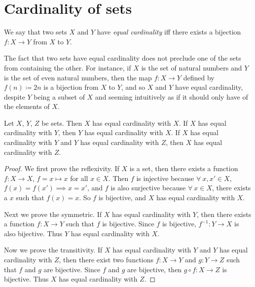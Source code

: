 \section{Cardinality of sets}

\begin{definition}\label{3.6.1}
We say that two sets \(X\) and \(Y\) have \emph{equal cardinality} iff there exists a bijection \(f : X \to Y\) from \(X\) to \(Y\).
\end{definition}

\setcounter{theorem}{2}
\begin{remark}\label{3.6.3}
The fact that two sets have equal cardinality does not preclude one of the sets from containing the other.
For instance, if \(X\) is the set of natural numbers and \(Y\) is the set of even natural numbers, then the map \(f : X \to Y\) defined by \(f(n) \coloneqq 2n\) is a bijection from \(X\) to \(Y\), and so \(X\) and \(Y\) have equal cardinality, despite \(Y\) being a subset of \(X\) and seeming intuitively as if it should only have  of the elements of \(X\).
\end{remark}

\begin{proposition}\label{3.6.4}
Let \(X\), \(Y\), \(Z\) be sets.
Then \(X\) has equal cardinality with \(X\).
If \(X\) has equal cardinality with \(Y\), then \(Y\) has equal cardinality with \(X\).
If \(X\) has equal cardinality with \(Y\) and \(Y\) has equal cardinality with \(Z\), then \(X\) has equal cardinality with \(Z\).
\end{proposition}

\begin{proof}
We first prove the reflexivity.
If \(X\) is a set, then there exists a function \(f : X \to X\), \(f = x \mapsto x\) for all \(x \in X\).
Then \(f\) is injective because \(\forall\ x, x' \in X\), \(f(x) = f(x') \implies x = x'\), and \(f\) is also surjective because \(\forall\ x \in X\), there exists a \(x\) such that \(f(x) = x\).
So \(f\) is bijective, and \(X\) has equal cardinality with \(X\).

Next we prove the symmetric.
If \(X\) has equal cardinality with \(Y\), then there exists a function \(f : X \to Y\) such that \(f\) is bijective.
Since \(f\) is bijective, \(f^{-1} : Y \to X\) is also bijective.
Thus \(Y\) has equal cardinality with \(X\).

Now we prove the transitivity.
If \(X\) has equal cardinality with \(Y\) and \(Y\) has equal cardinality with \(Z\), then there exist two functions \(f : X \to Y\) and \(g : Y \to Z\) such that \(f\) and \(g\) are bijective.
Since \(f\) and \(g\) are bijective, then \(g \circ f : X \to Z\) is bijective.
Thus \(X\) has equal cardinality with \(Z\).
\end{proof}

